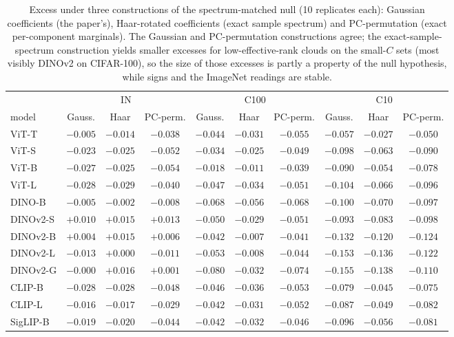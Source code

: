 \begin{table}[H]
\centering
\scriptsize
\setlength{\tabcolsep}{3pt}
\begin{tabular}{l|ccc|ccc|ccc}
\toprule
 & \multicolumn{3}{c}{IN} & \multicolumn{3}{c}{C100} & \multicolumn{3}{c}{C10} \\
model & Gauss. & Haar & PC-perm. & Gauss. & Haar & PC-perm. & Gauss. & Haar & PC-perm. \\
\midrule
ViT-T & $-0.005$ & $-0.014$ & $-0.038$ & $-0.044$ & $-0.031$ & $-0.055$ & $-0.057$ & $-0.027$ & $-0.050$ \\
ViT-S & $-0.023$ & $-0.025$ & $-0.052$ & $-0.034$ & $-0.025$ & $-0.049$ & $-0.098$ & $-0.063$ & $-0.090$ \\
ViT-B & $-0.027$ & $-0.025$ & $-0.054$ & $-0.018$ & $-0.011$ & $-0.039$ & $-0.090$ & $-0.054$ & $-0.078$ \\
ViT-L & $-0.028$ & $-0.029$ & $-0.040$ & $-0.047$ & $-0.034$ & $-0.051$ & $-0.104$ & $-0.066$ & $-0.096$ \\
\midrule
DINO-B & $-0.005$ & $-0.002$ & $-0.008$ & $-0.068$ & $-0.056$ & $-0.068$ & $-0.100$ & $-0.070$ & $-0.097$ \\
DINOv2-S & $+0.010$ & $+0.015$ & $+0.013$ & $-0.050$ & $-0.029$ & $-0.051$ & $-0.093$ & $-0.083$ & $-0.098$ \\
DINOv2-B & $+0.004$ & $+0.015$ & $+0.006$ & $-0.042$ & $-0.007$ & $-0.041$ & $-0.132$ & $-0.120$ & $-0.124$ \\
DINOv2-L & $-0.013$ & $+0.000$ & $-0.011$ & $-0.053$ & $-0.008$ & $-0.044$ & $-0.153$ & $-0.136$ & $-0.122$ \\
DINOv2-G & $-0.000$ & $+0.016$ & $+0.001$ & $-0.080$ & $-0.032$ & $-0.074$ & $-0.155$ & $-0.138$ & $-0.110$ \\
\midrule
CLIP-B & $-0.028$ & $-0.028$ & $-0.048$ & $-0.046$ & $-0.036$ & $-0.053$ & $-0.079$ & $-0.045$ & $-0.075$ \\
CLIP-L & $-0.016$ & $-0.017$ & $-0.029$ & $-0.042$ & $-0.031$ & $-0.052$ & $-0.087$ & $-0.049$ & $-0.082$ \\
SigLIP-B & $-0.019$ & $-0.020$ & $-0.044$ & $-0.042$ & $-0.032$ & $-0.046$ & $-0.096$ & $-0.056$ & $-0.081$ \\
\bottomrule
\end{tabular}
\caption{Excess under three constructions of the spectrum-matched null (10 replicates each): Gaussian coefficients (the paper's), Haar-rotated coefficients (exact sample spectrum) and PC-permutation (exact per-component marginals). The Gaussian and PC-permutation constructions agree; the exact-sample-spectrum construction yields smaller excesses for low-effective-rank clouds on the small-$C$ sets (most visibly DINOv2 on CIFAR-100), so the size of those excesses is partly a property of the null hypothesis, while signs and the ImageNet readings are stable.}
\label{tab:b27-nullvariants}
\end{table}
